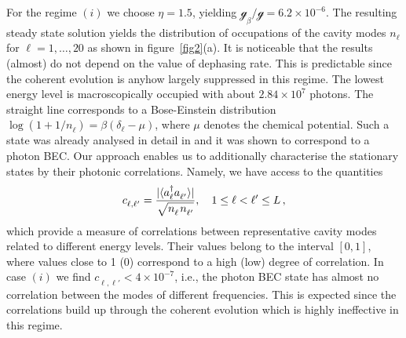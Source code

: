 \documentclass[12pt, a4paper]{iopart}
\newcommand{\avg}[1]{\langle{#1}\rangle}
\begin{document}
%
For the regime $(i)$ we choose $\eta=1.5$, yielding $\mathcal{g}_\beta/\mathcal{g}=6.2\times 10^{-6}$. The resulting steady state solution yields the distribution of occupations of the cavity modes $n_\ell^{}$ for $\ell=1,\ldots,20$ as shown in figure~\ref{fig2}(a). {It is noticeable that the results (almost) do not depend on the value of dephasing rate. This is predictable since the coherent evolution is anyhow largely suppressed in this regime.} The lowest energy level is macroscopically occupied with about $2.84\times 10^7$ photons. The straight line corresponds to a Bose-Einstein distribution $\log(1+1/{n_\ell^{}})=\beta(\delta_\ell-\mu)$, where $\mu$ denotes the chemical potential. Such a state was already analysed in detail in \cite{Keeling_PRL-nonequilibrium_model_photon-cond,Keeling-Thermalization_photon_condensate} and it was shown to correspond to a photon BEC. Our approach enables us to additionally characterise the stationary states by their photonic correlations. Namely, we have access to the quantities
%
\begin{equation}
c_{\ell,\ell'}^{}=\frac{|\avg{a^\dag_\ell a_{\ell'}^{}}|}{\sqrt{\vphantom{1}{n_\ell^{}}\;\!{n_{\ell'}^{}}}},\quad 1\le \ell<\ell'\le L\, ,
\end{equation}
%
which provide a measure of correlations between representative cavity modes related to different energy levels. Their values belong to the interval $[0,1]$, where values close to 1 (0) correspond to a high (low) degree of correlation. In case  $(i)$ we find $c_{\ell,\ell'}^{}<4\times 10^{-7}$, i.e., the photon BEC state has almost no correlation between the modes of different frequencies. This is expected since the correlations build up through the coherent evolution which is highly ineffective in this regime.
\end{document}
